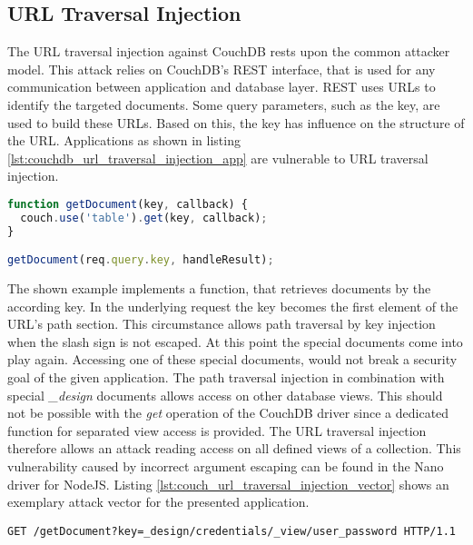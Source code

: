 \subsection{URL Traversal Injection}
The URL traversal injection against CouchDB rests upon the common attacker model. This attack relies on CouchDB's REST interface, that is used for any communication between application and database layer. REST uses URLs to identify the targeted documents. Some query parameters, such as the key, are used to build these URLs. Based on this, the key has influence on the structure of the URL. Applications as shown in listing \ref{lst:couchdb_url_traversal_injection_app} are vulnerable to URL traversal injection. \\

\begin{lstlisting}[caption={Vulnerable NodeJS example for URL traversal injection against CouchDB}, label={lst:couchdb_url_traversal_injection_app}, language=JavaScript]
function getDocument(key, callback) {
  couch.use('table').get(key, callback);
}

getDocument(req.query.key, handleResult);
\end{lstlisting}

The shown example implements a function, that retrieves documents by the according key. In the underlying request the key becomes the first element of the URL's path section. This circumstance allows path traversal by key injection when the slash sign is not escaped. At this point the special documents come into play again. Accessing one of these special documents, would not break a security goal of the given application. The path traversal injection in combination with special \emph{\_design} documents allows access on other database views. This should not be possible with the \emph{get} operation of the CouchDB driver since a dedicated function for separated view access is provided. The URL traversal injection therefore allows an attack reading access on all defined views of a collection. This vulnerability caused by incorrect argument escaping can be found in the Nano driver for NodeJS. Listing \ref{lst:couch_url_traversal_injection_vector} shows an exemplary attack vector for the presented application. \\

\begin{lstlisting}[caption={Attack vector against CouchDB for URL traversal injection via the query-string parameter}, label={lst:couch_url_traversal_injection_vector}]
GET /getDocument?key=_design/credentials/_view/user_password HTTP/1.1
\end{lstlisting}

